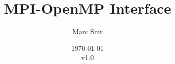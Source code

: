 \documentclass[twoside,11pt]{article}
\begin{document}
\title{\LARGE \bf MPI-OpenMP Interface}
 
\author{Marc Snir} 

\date{\today\\v1.0}
 
\maketitle





	





	


 


\end{document}
